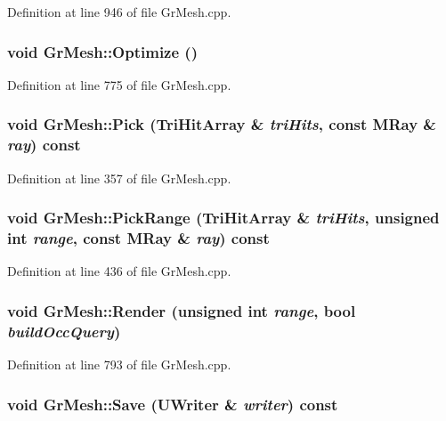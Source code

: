 Definition at line 946 of file GrMesh.cpp.\hypertarget{class_gr_mesh_3b9775285ccb15047c7ec7d026b1553c}{
\subsubsection[{Optimize}]{\setlength{\rightskip}{0pt plus 5cm}void GrMesh::Optimize ()}}
\label{class_gr_mesh_3b9775285ccb15047c7ec7d026b1553c}




Definition at line 775 of file GrMesh.cpp.\hypertarget{class_gr_mesh_abdbc531ac793a38243ab776d48de289}{
\subsubsection[{Pick}]{\setlength{\rightskip}{0pt plus 5cm}void GrMesh::Pick ({\bf TriHitArray} \& {\em triHits}, \/  const {\bf MRay} \& {\em ray}) const}}
\label{class_gr_mesh_abdbc531ac793a38243ab776d48de289}




Definition at line 357 of file GrMesh.cpp.\hypertarget{class_gr_mesh_460827f482933fc4d076225afdebd595}{
\subsubsection[{PickRange}]{\setlength{\rightskip}{0pt plus 5cm}void GrMesh::PickRange ({\bf TriHitArray} \& {\em triHits}, \/  unsigned int {\em range}, \/  const {\bf MRay} \& {\em ray}) const}}
\label{class_gr_mesh_460827f482933fc4d076225afdebd595}




Definition at line 436 of file GrMesh.cpp.\hypertarget{class_gr_mesh_44d75d42f7e25e048904ed371e276a81}{
\subsubsection[{Render}]{\setlength{\rightskip}{0pt plus 5cm}void GrMesh::Render (unsigned int {\em range}, \/  bool {\em buildOccQuery})}}
\label{class_gr_mesh_44d75d42f7e25e048904ed371e276a81}




Definition at line 793 of file GrMesh.cpp.\hypertarget{class_gr_mesh_ead45c368e214350ddb2f218471f18cc}{
\subsubsection[{Save}]{\setlength{\rightskip}{0pt plus 5cm}void GrMesh::Save ({\bf UWriter} \& {\em writer}) const}}
\label{class_gr_mesh_ead45c368e214350ddb2f218471f18cc}




